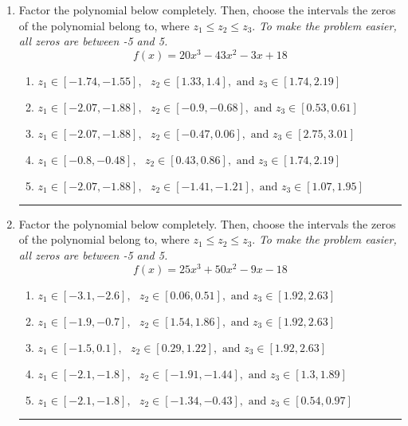 \documentclass[14pt]{extbook}
\newcommand{\litem}[1]{\item#1\hspace*{-1cm}\rule{\textwidth}{0.4pt}}
\begin{document}
\begin{enumerate}
{\begin{enumerate}[label=\Alph*.]
\end{enumerate} }
\litem{
Factor the polynomial below completely. Then, choose the intervals the zeros of the polynomial belong to, where $z_1 \leq z_2 \leq z_3$. \textit{To make the problem easier, all zeros are between -5 and 5.}\[ f(x) = 20x^{3} -43 x^{2} -3 x + 18 \]\begin{enumerate}[label=\Alph*.]
\item \( z_1 \in [-1.74, -1.55], \text{   }  z_2 \in [1.33, 1.4], \text{   and   } z_3 \in [1.74, 2.19] \)
\item \( z_1 \in [-2.07, -1.88], \text{   }  z_2 \in [-0.9, -0.68], \text{   and   } z_3 \in [0.53, 0.61] \)
\item \( z_1 \in [-2.07, -1.88], \text{   }  z_2 \in [-0.47, 0.06], \text{   and   } z_3 \in [2.75, 3.01] \)
\item \( z_1 \in [-0.8, -0.48], \text{   }  z_2 \in [0.43, 0.86], \text{   and   } z_3 \in [1.74, 2.19] \)
\item \( z_1 \in [-2.07, -1.88], \text{   }  z_2 \in [-1.41, -1.21], \text{   and   } z_3 \in [1.07, 1.95] \)

\end{enumerate} }
\litem{
Factor the polynomial below completely. Then, choose the intervals the zeros of the polynomial belong to, where $z_1 \leq z_2 \leq z_3$. \textit{To make the problem easier, all zeros are between -5 and 5.}\[ f(x) = 25x^{3} +50 x^{2} -9 x -18 \]\begin{enumerate}[label=\Alph*.]
\item \( z_1 \in [-3.1, -2.6], \text{   }  z_2 \in [0.06, 0.51], \text{   and   } z_3 \in [1.92, 2.63] \)
\item \( z_1 \in [-1.9, -0.7], \text{   }  z_2 \in [1.54, 1.86], \text{   and   } z_3 \in [1.92, 2.63] \)
\item \( z_1 \in [-1.5, 0.1], \text{   }  z_2 \in [0.29, 1.22], \text{   and   } z_3 \in [1.92, 2.63] \)
\item \( z_1 \in [-2.1, -1.8], \text{   }  z_2 \in [-1.91, -1.44], \text{   and   } z_3 \in [1.3, 1.89] \)
\item \( z_1 \in [-2.1, -1.8], \text{   }  z_2 \in [-1.34, -0.43], \text{   and   } z_3 \in [0.54, 0.97] \)


\end{enumerate}}
\end{enumerate}
\end{document}
